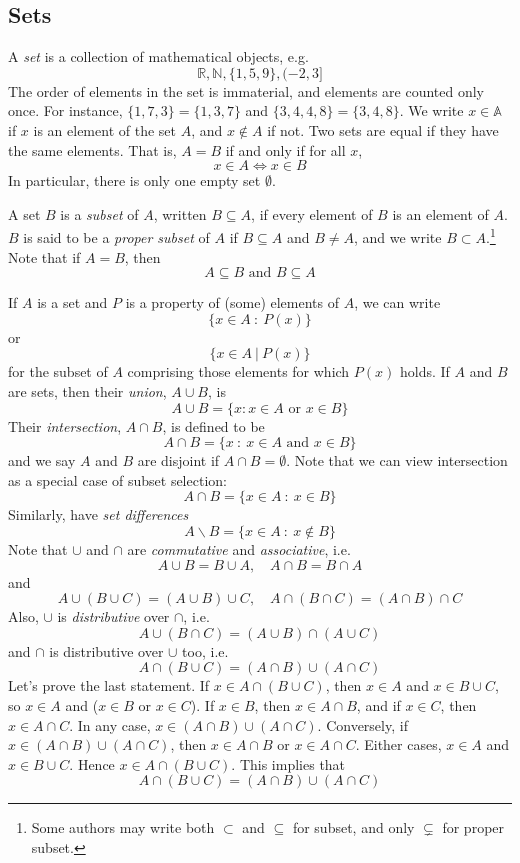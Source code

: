 \documentclass[10pt, a4paper, twoside]{report}
\begin{document}
\subsection{Sets}
A \emph{set} is a collection of mathematical objects, e.g. 
\[\mathbb{R},\mathbb{N},\{1,5,9\},(-2,3]\]
The order of elements in the set is immaterial, and elements are counted only once. For instance, \(\{1,7,3\}=\{1,3,7\}\) and \(\{3,4,4,8\}=\{3,4,8\}\). We write \(x\in\mathbb{A}\) if \(x\) is an element of the set \(A\), and \(x\notin A\) if not. Two sets are equal if they have the same elements. That is, \(A=B\) if and only if for all \(x\),
\[x\in A\Leftrightarrow x\in B\]
In particular, there is only one empty set \(\emptyset\).

A set \(B\) is a \emph{subset} of \(A\), written \(B\subseteq A\), if every element of \(B\) is an element of \(A\). \(B\) is said to be a \emph{proper subset} of \(A\) if \(B\subseteq A\) and \(B\neq A\), and we write \(B\subset A\).\footnote{Some authors may write both \(\subset\) and \(\subseteq\) for subset, and only \(\subsetneq\) for proper subset.} Note that if \(A=B\), then
\[A\subseteq B\text{ and  }B\subseteq A\]

If \(A\) is a set and \(P\) is a property of (some) elements of \(A\), we can write
\[\{x\in A\::\:P(x)\}\]
or 
\[\{x\in A\:|\:P(x)\}\]
for the subset of \(A\) comprising those elements for which \(P(x)\) holds. If \(A\) and \(B\) are sets, then their \emph{union}, \(A\cup B\), is 
\[A\cup B=\{x:x\in A\text{  or  }x\in B\}\]
Their \emph{intersection}, \(A\cap B\), is defined to be 
\[A\cap B=\{x\::\:x\in A\text{  and  }x\in B\}\]
and we say \(A\) and \(B\) are disjoint if \(A\cap B=\emptyset\). Note that we can view intersection as a special case of subset selection:
\[A\cap B=\{x\in A\::\:x\in B\}\]
Similarly, have \emph{set differences}
\[A\backslash B=\{x\in A\::\:x\notin B\}\]
Note that \(\cup\) and \(\cap\) are \emph{commutative} and \emph{associative}, i.e. 
\[A\cup B=B\cup A,\quad A\cap B=B\cap A\]
and 
\[A\cup(B\cup C)=(A\cup B)\cup C,\quad A\cap(B\cap C)=(A\cap B)\cap C\]
Also, \(\cup\) is \emph{distributive} over \(\cap\), i.e. 
\[A\cup(B\cap C)=(A\cup B)\cap(A\cup C)\]
and \(\cap\) is distributive over \(\cup\) too, i.e.
\[A\cap(B\cup C)=(A\cap B)\cup(A\cap C)\]
Let's prove the last statement. If \(x\in A\cap(B\cup C)\), then \(x\in A\) and \(x\in B\cup C\), so \(x\in A\) and (\(x\in B\) or \(x\in C\)). If \(x\in B\), then \(x\in A\cap B\), and if \(x\in C\), then \(x\in A\cap C\). In any case, \(x\in (A\cap B)\cup(A\cap C)\). Conversely, if \(x\in (A\cap B)\cup(A\cap C)\), then \(x\in A\cap B\) or \(x\in A\cap C\). Either cases, \(x\in A\) and \(x\in B\cup C\). Hence \(x\in A\cap(B\cup C)\). This implies that 
\[A\cap(B\cup C)=(A\cap B)\cup(A\cap C)\]
\end{document}

